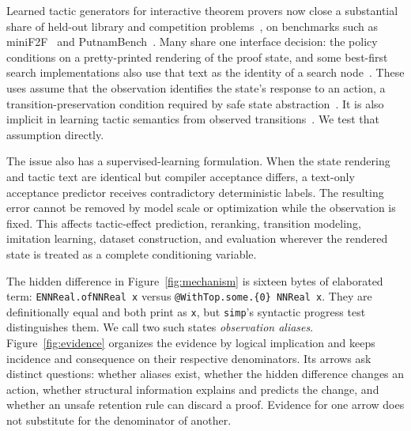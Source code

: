 \documentclass[11pt]{article}
\begin{document}
Learned tactic generators for interactive theorem provers now close a
substantial share of held-out library and competition
problems~\cite{polu2020gpt-f,han2022pact,lample2022hypertree,yang2023leandojo,
jiang2023draft}, on benchmarks such as miniF2F~\cite{zheng2022minif2f} and
PutnamBench~\cite{tsoukalas2024putnambench}. Many share one interface
decision: the policy conditions on a pretty-printed rendering of the proof
state, and some best-first search implementations also use that text as the
identity of a search node~\cite{yang2023leandojo,lample2022hypertree}. These
uses assume that the observation identifies the state's response to an action,
a transition-preservation condition required by safe state
abstraction~\cite{givan2003equivalence,li2006towards}. It is also implicit in
learning tactic semantics from observed transitions~\cite{samoylov2025operators,
lamont2025threedprover}. We test that assumption directly.

The issue also has a supervised-learning formulation. When the state rendering
and tactic text are identical but compiler acceptance differs, a text-only
acceptance predictor receives contradictory deterministic labels. The resulting
error cannot be removed by model scale or optimization while the observation
is fixed. This affects tactic-effect prediction, reranking, transition
modeling, imitation learning, dataset construction, and evaluation wherever
the rendered state is treated as a complete conditioning variable.

\FigMechanism
\FigEvidence
The hidden difference in Figure~\ref{fig:mechanism} is sixteen bytes of
elaborated term: \texttt{ENNReal.ofNNReal x} versus
\texttt{@WithTop.some.\{0\} NNReal x}. They are definitionally equal and both
print as \texttt{{\textuparrow}x}, but \texttt{simp}'s syntactic progress test
distinguishes them. We call two such states \emph{observation aliases}.
Figure~\ref{fig:evidence} organizes the evidence by logical implication and
keeps incidence and consequence on their respective denominators. Its arrows
ask distinct questions: whether aliases exist, whether the hidden difference
changes an action, whether structural information explains and predicts the
change, and whether an unsafe retention rule can discard a proof. Evidence for
one arrow does not substitute for the denominator of another.
\end{document}
